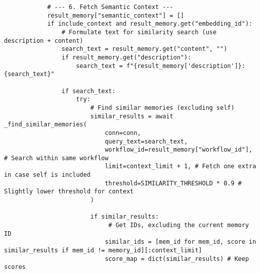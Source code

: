 \documentclass[12pt,a4paper]{article}
\begin{document}
\begin{pageablecode}
\begin{verbatim}
            # --- 6. Fetch Semantic Context ---
            result_memory["semantic_context"] = []
            if include_context and result_memory.get("embedding_id"):
                # Formulate text for similarity search (use description + content)
                search_text = result_memory.get("content", "")
                if result_memory.get("description"):
                    search_text = f"{result_memory['description']}: {search_text}"

                if search_text:
                    try:
                        # Find similar memories (excluding self)
                        similar_results = await _find_similar_memories(
                            conn=conn,
                            query_text=search_text,
                            workflow_id=result_memory["workflow_id"], # Search within same workflow
                            limit=context_limit + 1, # Fetch one extra in case self is included
                            threshold=SIMILARITY_THRESHOLD * 0.9 # Slightly lower threshold for context
                        )

                        if similar_results:
                             # Get IDs, excluding the current memory ID
                            similar_ids = [mem_id for mem_id, score in similar_results if mem_id != memory_id][:context_limit]
                            score_map = dict(similar_results) # Keep scores


\end{verbatim}
\end{pageablecode}
\end{document}
